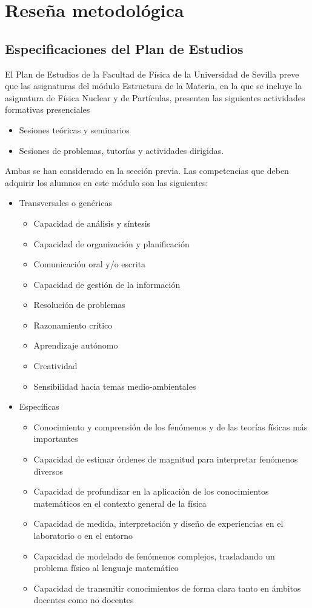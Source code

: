 \documentclass[a4paper,12pt,twoside]{article}
\begin{document}
\section{Reseña metodológica}

\subsection{Especificaciones del Plan de Estudios}

El Plan de Estudios de la Facultad de Física  de la Universidad de Sevilla \cite{planest} preve que las asignaturas del módulo Estructura de la Materia, en la que se incluye la asignatura de Física Nuclear y de Partículas, presenten las siguientes actividades formativas presenciales

\begin{itemize}
\item Sesiones teóricas y seminarios
\item Sesiones de problemas, tutorías y actividades dirigidas.
\end{itemize}

Ambas se han considerado en la sección previa. Las competencias que deben adquirir los alumnos en este módulo son las siguientes:

\begin{itemize}
\item Transversales o genéricas
\begin{itemize}
\item Capacidad de análisis y síntesis
\item Capacidad de organización y planificación
\item Comunicación oral y/o escrita
\item Capacidad de gestión de la información
\item Resolución de problemas
\item Razonamiento crítico
\item Aprendizaje autónomo
\item Creatividad
\item Sensibilidad hacia temas medio-ambientales
\end{itemize}
\item Específicas
\begin{itemize}
\item Conocimiento y comprensión de los fenómenos y de las teorías físicas más importantes
\item Capacidad de estimar órdenes de magnitud para interpretar fenómenos diversos
\item Capacidad de profundizar en la aplicación de los conocimientos matemáticos en el contexto general de la física
\item Capacidad de medida, interpretación y diseño de experiencias en el laboratorio o en el entorno
\item Capacidad de modelado de fenómenos complejos, trasladando un problema físico al lenguaje matemático
\item Capacidad de transmitir conocimientos de forma clara tanto en ámbitos docentes como no docentes
\end{itemize}
\end{itemize}
\end{document}
